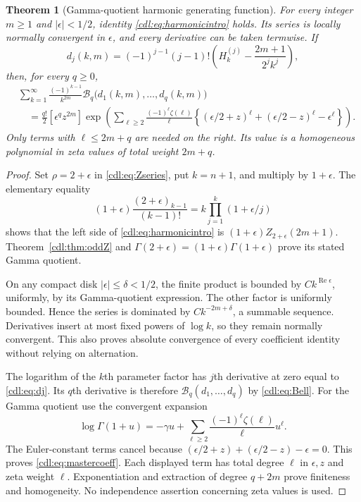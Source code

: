 \documentclass[11pt,letterpaper]{article}
\numberwithin{equation}{section}
\newtheorem{theorem}{Theorem}[section]
\theoremstyle{definition}\newtheorem{definition}[theorem]{Definition}
\theoremstyle{remark}\newtheorem{remark}[theorem]{Remark}
\newcommand{\Rea}{\operatorname{Re}}\newcommand{\Ima}{\operatorname{Im}}
\newcommand{\B}{\mathcal B}\newcommand{\PP}{\mathcal P}
\begin{document}
\begin{theorem}[Gamma-quotient harmonic generating function]
\label{cdl:thm:harmonicmaster}
For every integer $m\ge1$ and $|\epsilon|<1/2$, identity
\eqref{cdl:eq:harmonicintro} holds. Its series is locally normally
convergent in $\epsilon$, and every derivative can be taken termwise.
If
\begin{equation}\label{cdl:eq:dj}
 d_j(k,m)=(-1)^{j-1}(j-1)!
 \left(H_k^{(j)}-\frac{2m+1}{2^jk^j}\right),
\end{equation}
then, for every $q\ge0$,
\begin{equation}\label{cdl:eq:mastercoeff}
 \begin{split}
 &\sum_{k=1}^\infty\frac{(-1)^{k-1}}{k^{2m}}
 \B_q\bigl(d_1(k,m),\ldots,d_q(k,m)\bigr)\\
 &\quad=\frac{q!}{2}[\epsilon^qz^{2m}]
 \exp\left(\sum_{\ell\ge2}\frac{(-1)^\ell\zeta(\ell)}\ell
 \left\{(\epsilon/2+z)^\ell+(\epsilon/2-z)^\ell-\epsilon^\ell\right\}\right).
 \end{split}
\end{equation}
Only terms with $\ell\le2m+q$ are needed on the right. Its value is
a homogeneous polynomial in zeta values of total weight $2m+q$.
\end{theorem}
\begin{proof}
Set $\rho=2+\epsilon$ in \eqref{cdl:eq:Zseries}, put $k=n+1$, and
multiply by $1+\epsilon$. The elementary equality
\[
 (1+\epsilon)\frac{(2+\epsilon)_{k-1}}{(k-1)!}
 =k\prod_{j=1}^k(1+\epsilon/j)
\]
shows that the left side of \eqref{cdl:eq:harmonicintro} is
$(1+\epsilon)Z_{2+\epsilon}(2m+1)$. Theorem~\ref{cdl:thm:oddZ}
and $\Gamma(2+\epsilon)=(1+\epsilon)\Gamma(1+\epsilon)$ prove
its stated Gamma quotient.

On any compact disk $|\epsilon|\le\delta<1/2$, the finite product is
bounded by $C k^{\Rea\epsilon}$, uniformly, by its Gamma-quotient
expression. The other factor is uniformly bounded. Hence the series
is dominated by $Ck^{-2m+\delta}$, a summable sequence. Derivatives
insert at most fixed powers of $\log k$, so they remain normally
convergent. This also proves absolute convergence of every coefficient
identity without relying on alternation.

The logarithm of the $k$th parameter factor has $j$th derivative at
zero equal to \eqref{cdl:eq:dj}. Its $q$th derivative is therefore
$\B_q(d_1,\ldots,d_q)$ by \eqref{cdl:eq:Bell}.
For the Gamma quotient use the convergent expansion
\[
 \log\Gamma(1+u)=-\gamma u+
 \sum_{\ell\ge2}\frac{(-1)^\ell\zeta(\ell)}\ell u^\ell.
\]
The Euler-constant terms cancel because
$(\epsilon/2+z)+(\epsilon/2-z)-\epsilon=0$.
This proves \eqref{cdl:eq:mastercoeff}. Each displayed term has total
degree $\ell$ in $\epsilon,z$ and zeta weight $\ell$. Exponentiation
and extraction of degree $q+2m$ prove finiteness and homogeneity.
No independence assertion concerning zeta values is used.
\end{proof}
\end{document}
